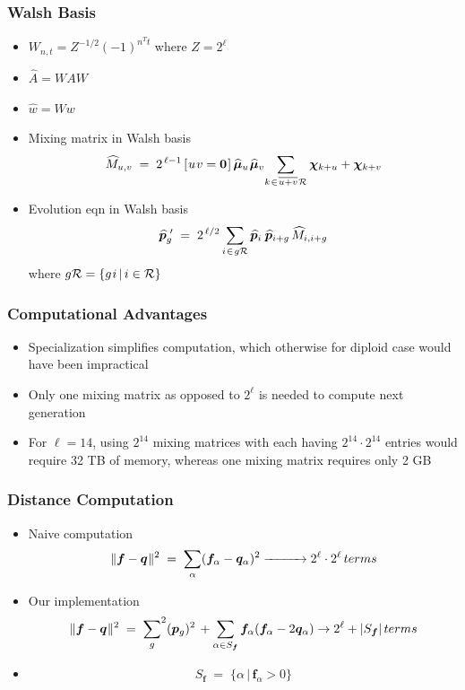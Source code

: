 \documentclass[aspectratio=169]{beamer}
\newcommand{\nudge}{\hspace{0.01in}}
\begin{document}
  \begin{frame}
    \frametitle{Walsh Basis}
    \begin{itemize}
	\item{$W_{n,t} = Z^{-1/2} (-1)^{n^T t}$ where $Z = 2^\ell$}
	\item{$\widehat{A} = WAW$}
	\item{$\widehat{w} = Ww$}
	\item{Mixing matrix in Walsh basis 
	\[
	  \widehat{M}_{u,v} \; = \; 2^{\,\ell-1} \,[\nudge u \nudge v = {\bf
	  0}\nudge]\, \widehat{\bm{\mu}}_u \nudge \widehat{\bm{\mu}}_v \!  \sum_{k
	\nudge \in \nudge \overline{u+v} \nudge \mathcal{R}} \bm{\chi}_{k + u} +
	\bm{\chi}_{k + v}
	\]
	}
	\item{Evolution eqn in Walsh basis 
	\[
	  \widehat{\bm{p}}_g^{\,\,\prime} \; = \; 2^{\,\ell/2} \sum_{i \nudge \in \nudge g \mathcal{R}}
	  \widehat{\bm{p}}_i \, \nudge \widehat{\bm{p}}_{i+g} \,\widehat{M}_{i,i+g}
	\]
	 where $g \mathcal{R} = \{g \nudge i \, | \, i \in \mathcal{R} \}$
	}
    \end{itemize}
  \end{frame}
  
  \begin{frame}
    \frametitle{Computational Advantages}
    \begin{itemize}
      \item{Specialization simplifies computation, which otherwise for diploid case would have been impractical} 
      \item{Only one mixing matrix as opposed to $2^\ell$ is needed to compute next generation}
      \item{For $\ell = 14$, using $2^{14}$ mixing matrices with each having $2^{14} \cdot 2^{14}$ 
      entries would require 32 TB of memory, whereas one mixing matrix requires only 2 GB}
    \end{itemize}
  \end{frame}
  
  \begin{frame}
    \frametitle{Distance Computation}
    \begin{itemize}      
      \item{Naive computation 
      \[
	\|{\bm f} - {\bm q} \hspace{0.005in} \|^2 \; = \;
	  {\sum_{\alpha}} ({\bm f}_\alpha-{\bm q}_\alpha)^2 
	   \xrightarrow{\hspace*{1cm}} 2^\ell \cdot 2^\ell \, terms 
	\]}
      \item{Our implementation
	\begin{equation*}
	  \|{\bm f} - {\bm q} \hspace{0.005in} \|^2 \; = \; {\sum_{g}}^2 ({\bm p}_{g})^2 \, +
	  \sum_{\alpha \in {S_{\bm f}}} {\bm f}_\alpha ({\bm f}_\alpha- 2 {\bm q}_\alpha) \to 2^\ell + |S_{\bm f}| \, terms 
	\end{equation*}
      }
      \item{\[
	      S_{\bm f} \; = \; \{ \alpha \, | \, {\bm f}_\alpha > 0 \}
	      \]
      }
    \end{itemize}
  \end{frame}
  
\end{document}
